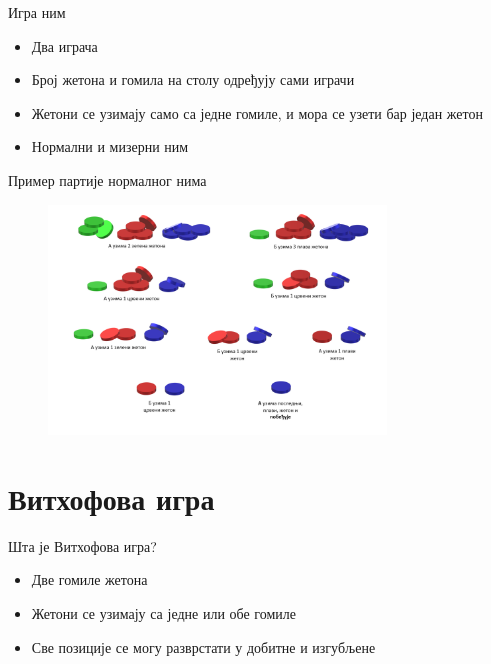 \documentclass[10pt]{beamer}
\begin{document}
	\begin{frame}{Игра ним}
		\begin{itemize}
			\item Два играча
			\item Број жетона и гомила на столу одређују сами играчи
			\item Жетони се узимају само са једне гомиле, и мора се узети бар један жетон
			\item Нормални и мизерни ним
		\end{itemize}
	\end{frame}		
%
		
	\begin{frame}{Пример партије нормалног нима}
		\begin{figure}
	        \centering
	        \includegraphics[width=0.8\textwidth]{../src/statistics/picture/NimPrimer.png}
	    \end{figure}
	\end{frame}

\section{Витхофова игра}
	\begin{frame}{Шта је Витхофова игра?}
		
		\begin{itemize}
			\item Две гомиле жетона
			\item Жетони се узимају са једне или обе гомиле
			\item Све позиције се могу разврстати у добитне и изгубљене
		\end{itemize}
	\end{frame}
\end{document}
